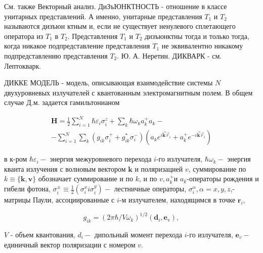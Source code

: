 \documentclass[10pt]{article}
\begin{document}
См. также Векторный анализ. ДиЗъЮНКТНОСТЬ - отношение в классе унитарных представлений. А именно, унитарные представления $T_{1}$ и $T_{2}$ называются дизъюн ктным и, если не существует ненулевого сплетающего оператора из $T_{1}$ в $T_{2}$. Представления $T_{1}$ и $T_{2}$ дизъюнктны тогда и только тогда, когда никакое подпредставление представления $T_{1}$ не эквивалентно никакому подпредставлению представления $T_{2}$. Ю. А. Неретин. ДИКВАРК - см. Лептокварк.



ДИККЕ МОДЕЛЬ - модель, описывающая взаимодействие системы $N$ двухуровневых излучателей с квантованным электромагнитным полем. В общем случае Д.м. задается гамильтонианом



\[

\begin{gathered}

\boldsymbol{H}=\frac{1}{2} \sum_{i=1}^{N} \hbar \varepsilon_{i} \sigma_{i}^{z}+\sum_{k} \hbar \omega_{k} a_{k}^{+} a_{k}- \\

-\sum_{i=1}^{N} \sum_{k}\left(g_{i k} \sigma_{i}^{+}+g_{i k}^{*} \sigma_{i}^{-}\right)\left(a_{k} e^{i \overrightarrow{\boldsymbol{k}} \vec{r}_{i}}+a_{k}^{+} e^{-i \overrightarrow{\boldsymbol{k}} \vec{r}_{i}}\right)

\end{gathered}

\]



в к-ром $\hbar \varepsilon_{i}-$ энергия межуровневого перехода $i$-го излучателя, $\hbar \omega_{k}-$ энергия кванта излучения с волновым вектором $\boldsymbol{k}$ и поляризацией $v$, суммирование по $k \equiv\{\boldsymbol{k}, \boldsymbol{v}\}$ обозначает суммирование и по $k$, и по $v, a_{k}^{+}$и $a_{k}$-операторы рождения и гибели фотона, $\sigma_{i}^{ \pm} \equiv \frac{1}{2}\left(\sigma_{i}^{x} i \sigma_{i}^{y}\right)-$ лестничные операторы, $\sigma_{i}^{\alpha}, \alpha=x, y, z$,- матрицы Паули, ассоциированные с $i$-м излучателем, находящимся в точке $\boldsymbol{r}_{i}$,



\[

g_{i k}=\left(2 \pi \hbar / V \omega_{k}\right)^{1 / 2}\left(\boldsymbol{d}_{i}, \boldsymbol{e}_{\mathrm{v}}\right),

\]



$V$ - объем квантования, $d_{i}-$ дипольный момент перехода $i$-го излучателя, $\boldsymbol{e}_{v}-$ единичный вектор поляризации с номером $v$.
\end{document}
